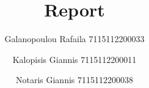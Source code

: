 %
\begin{titlepage}
  \title{Report}
  \author{
  Galanopoulou Rafaila 7115112200033 
  \and
  Kalopisis Giannis 7115112200011
  \and
  Notaris Giannis 7115112200038}
  \maketitle
  
\end{titlepage}
\clearpage
